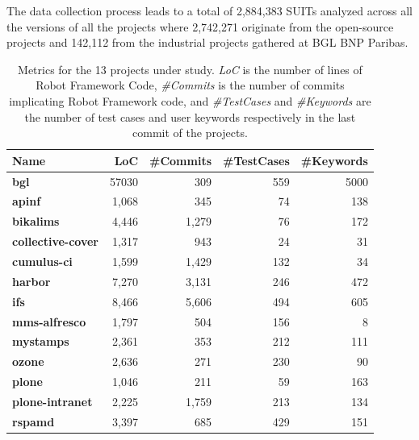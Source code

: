 The data collection process leads to a total of 2,884,383 SUITs analyzed across all the versions of all the projects where 2,742,271 originate from the open-source projects and 142,112 from the industrial projects gathered at BGL BNP Paribas.

\begin{table}
\centering

\begin{tabular}{LRRRR}

\caption{Metrics for the 13 projects under study. \emph{LoC} is the number of lines of Robot Framework Code, \emph{\#Commits} is the number of commits implicating Robot Framework code, and \emph{\#TestCases} and \emph{\#Keywords} are the number of test cases and user keywords respectively in the last commit of the projects.}
\label{tab:projects}

\toprule
\scriptsize{\textbf{Name}} & \scriptsize{\textbf{LoC}} & \scriptsize{\textbf{\#Commits}} & \scriptsize{\textbf{\#TestCases}} & \scriptsize{\textbf{\#Keywords}} \\
\toprule

\scriptsize{\textbf{bgl}} & \scriptsize{57030} & \scriptsize{309} & \scriptsize{559} & \scriptsize{5000} \\

\midrule

\scriptsize{\textbf{apinf}} & \scriptsize{1,068} & \scriptsize{345} & \scriptsize{74} & \scriptsize{138} \\
\scriptsize{\textbf{bikalims}} & \scriptsize{4,446} & \scriptsize{1,279} & \scriptsize{76} & \scriptsize{172} \\
\scriptsize{\textbf{collective-cover}} & \scriptsize{1,317} & \scriptsize{943} & \scriptsize{24} & \scriptsize{31} \\
\scriptsize{\textbf{cumulus-ci}} & \scriptsize{1,599} & \scriptsize{1,429} & \scriptsize{132} & \scriptsize{34} \\
\scriptsize{\textbf{harbor}} & \scriptsize{7,270} & \scriptsize{3,131} & \scriptsize{246} & \scriptsize{472} \\
\scriptsize{\textbf{ifs}} & \scriptsize{8,466} & \scriptsize{5,606} & \scriptsize{494} & \scriptsize{605} \\
\scriptsize{\textbf{mms-alfresco}} & \scriptsize{1,797} & \scriptsize{504} & \scriptsize{156} & \scriptsize{8} \\
\scriptsize{\textbf{mystamps}} & \scriptsize{2,361} & \scriptsize{353} & \scriptsize{212} & \scriptsize{111} \\
\scriptsize{\textbf{ozone}} & \scriptsize{2,636} & \scriptsize{271} & \scriptsize{230} & \scriptsize{90} \\
\scriptsize{\textbf{plone}} & \scriptsize{1,046} & \scriptsize{211} & \scriptsize{59} & \scriptsize{163} \\
\scriptsize{\textbf{plone-intranet}} & \scriptsize{2,225} & \scriptsize{1,759} & \scriptsize{213} & \scriptsize{134} \\
\scriptsize{\textbf{rspamd}} & \scriptsize{3,397} & \scriptsize{685} & \scriptsize{429} & \scriptsize{151} \\


\end{tabular}
\end{table}
